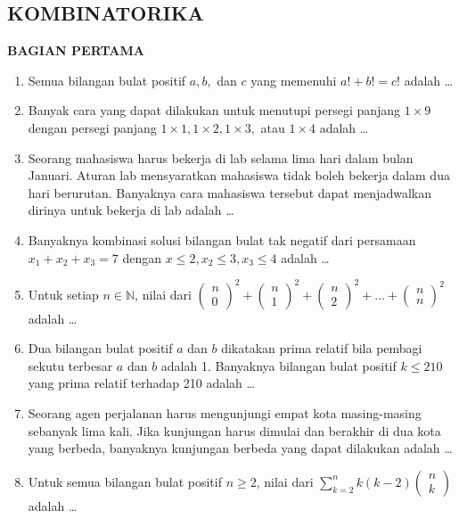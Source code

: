 \documentclass[12pt,twoside]{article}
\begin{document}
\subsection{KOMBINATORIKA}
\textbf{BAGIAN PERTAMA}
\begin{enumerate}
	\item Semua bilangan bulat positif $a,b,$ dan $c$ yang memenuhi $a! +b! = c!$ adalah \dots

	\item Banyak cara yang dapat dilakukan untuk menutupi persegi panjang $1 \times 9$ dengan persegi panjang $1 \times 1, 1 \times 2, 1\times3,$ atau $1\times4$ adalah \dots

	\item Seorang mahasiswa harus bekerja di lab selama lima hari dalam bulan Januari. Aturan lab mensyaratkan mahasiswa tidak boleh bekerja dalam dua hari berurutan. Banyaknya cara mahasiswa tersebut dapat menjadwalkan dirinya untuk bekerja di lab adalah \dots

	\item Banyaknya kombinasi solusi bilangan bulat tak negatif dari persamaan $x_1 + x_2 + x_3 = 7$ dengan $x \leq 2, x_2 \leq 3, x_3 \leq 4$ adalah \dots

	\item Untuk setiap $n \in \mathbb{N}$, nilai dari $\left( \begin{array}{c}
				      n \\0
			      \end{array} \right)^2 +
		      \left( \begin{array}{c}
				      n \\1
			      \end{array} \right)^2 +
		      \left( \begin{array}{c}
				      n \\2
			      \end{array} \right)^2 + \dots +
		      \left( \begin{array}{c}
				      n \\n
			      \end{array} \right)^2 $ adalah \dots

	\item Dua bilangan bulat positif $a$ dan $b$ dikatakan prima relatif bila pembagi sekutu terbesar $a$ dan $b$ adalah 1. Banyaknya bilangan bulat positif $k \leq 210$ yang prima
	      relatif terhadap 210 adalah \dots

	\item Seorang agen perjalanan harus mengunjungi empat kota masing-masing sebanyak lima kali. Jika kunjungan harus dimulai dan berakhir di dua kota yang berbeda, banyaknya kunjungan berbeda yang dapat dilakukan adalah \dots

	\item Untuk semua bilangan bulat positif $n \geq 2$, nilai dari $\displaystyle\sum_{k=2}^{n}k(k-2)\begin{pmatrix}
			      n \\k
		      \end{pmatrix}$ adalah \dots
\end{enumerate}
\end{document}
